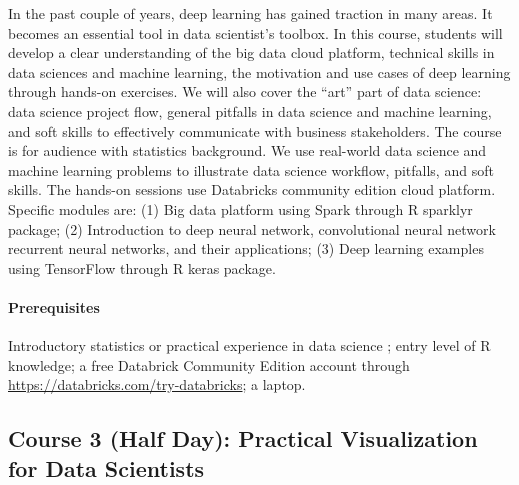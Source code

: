 \documentclass[11pt]{article}
\newcommand{\pkg}[1]{{\normalfont\fontseries{b}\selectfont #1}}
\begin{document}
In the past couple of years, deep learning has gained traction in many
areas. It becomes an essential tool in data scientist’s toolbox. In
this course, students will develop a clear understanding of the big
data cloud platform, technical skills in data sciences and machine
learning, the motivation and use cases of deep learning through
hands-on exercises. We will also cover the ``art'' part of data
science: data science project flow, general pitfalls in data science
and machine learning, and soft skills to effectively communicate with
business stakeholders. The course is for audience with statistics
background. We use real-world data science and machine learning
problems to illustrate data science workflow, pitfalls, and soft
skills. The hands-on sessions use Databricks community edition cloud
platform. Specific modules are: 
(1) Big data platform using Spark through R \pkg{sparklyr} package;
(2) Introduction to deep neural network, convolutional neural network
recurrent neural networks, and their applications;
(3) Deep learning examples using TensorFlow through R \pkg{keras}
package.


\paragraph{Prerequisites}

Introductory statistics or practical experience in data science ;
entry level of R knowledge; a free Databrick Community Edition account
through \url{https://databricks.com/try-databricks}; a laptop.



\subsection*{Course 3 (Half Day): Practical Visualization for Data Scientists}
\end{document}
